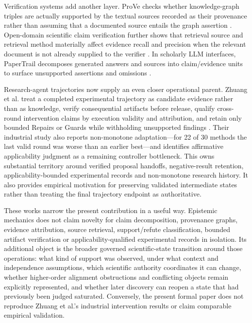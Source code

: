\documentclass[11pt]{article}
\begin{document}
Verification systems add another layer. ProVe checks whether knowledge-graph triples are actually supported by the textual sources recorded as their provenance rather than assuming that a documented source entails the graph assertion \cite{amaral2024prove}. Open-domain scientific claim verification further shows that retrieval source and retrieval method materially affect evidence recall and precision when the relevant document is not already supplied to the verifier \cite{vladika2024}. In scholarly LLM interfaces, PaperTrail decomposes generated answers and sources into claim/evidence units to surface unsupported assertions and omissions \cite{martinboyle2026}.

Research-agent trajectories now supply an even closer operational parent. Zhuang et al. treat a completed experimental trajectory as candidate evidence rather than as knowledge, verify consequential artifacts before release, qualify cross-round intervention claims by execution validity and attribution, and retain only bounded Repairs or Guards while withholding unsupported findings \cite{zhuang2026trajectory}. Their industrial study also reports non-monotone adaptation---for 22 of 30 methods the last valid round was worse than an earlier best---and identifies affirmative applicability judgment as a remaining controller bottleneck. This owns substantial territory around verified proposal handoffs, negative-result retention, applicability-bounded experimental records and non-monotone research history. It also provides empirical motivation for preserving validated intermediate states rather than treating the final trajectory endpoint as authoritative.

These works narrow the present contribution in a useful way. Epistemic mechanics does not claim novelty for claim decomposition, provenance graphs, evidence attribution, source retrieval, support/refute classification, bounded artifact verification or applicability-qualified experimental records in isolation. Its additional object is the broader governed scientific-state transition around those operations: what kind of support was observed, under what context and independence assumptions, which scientific authority coordinates it can change, whether higher-order alignment obstructions and conflicting objects remain explicitly represented, and whether later discovery can reopen a state that had previously been judged saturated. Conversely, the present formal paper does not reproduce Zhuang et al.'s industrial intervention results or claim comparable empirical validation.
\end{document}
